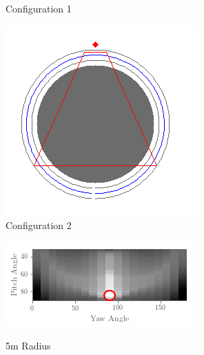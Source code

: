 \documentclass[a4paper,12pt,twoside,openright]{report}
\begin{document}
\begin{figure}[h!]
\begin{subfigure}[b]{0.25\textwidth}
    \caption{Configuration 1}
\end{subfigure}
\begin{subfigure}[b]{0.25\textwidth}
    \centering
    \includegraphics[width=\textwidth]{figures/simple_objective/radius_20m_pos2_small.png}
    \caption{Configuration 2}
\end{subfigure}
\begin{subfigure}[b]{0.45\textwidth}
    \centering
    \includegraphics[width=\textwidth]{figures/simple_objective/pitch_yaw_at_radius_5_annotated.png}
    \label{fig:simpleobjective:20radius}
    \caption{5m Radius}
\end{subfigure}
\begin{subfigure}[b]{0.45\textwidth}
    \centering

\end{subfigure}
\end{figure}
\end{document}

